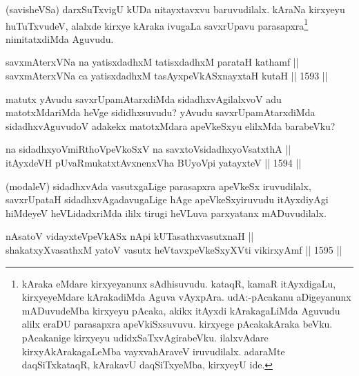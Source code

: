 \begin{artha}
(savisheVSa) darxSuTxvigU kUDa nitayxtavxvu baruvudilalx. kAraNa kirxyeyu huTuTxvudeV, alalxde kirxye kAraka ivugaLa savxrUpavu parasapxra\footnote{kAraka eMdare kirxyeyanunx sAdhisuvudu. kataqR, kamaR itAyxdigaLu, kirxyeyeMdare kArakadiMda Aguva vAyxpAra. udA:-pAcakanu aDigeyanunx mADuvudeMba kirxyeyu pAcaka, akikx itAyxdi kArakagaLiMda Aguvudu alilx eraDU parasapxra apeVkiSxsuvuvu. kirxyege pAcakakAraka beVku. pAcakanige kirxyeyu udidxSaTxvAgirabeVku. ilalxvAdare kirxyAkArakagaLeMba vayxvahAraveV iruvudilalx. adaraMte daqSiTxkataqR, kArakavU daqSiTxyeMba, kirxyeyU ide.} nimitatxdiMda Aguvudu.
\end{artha}


\begin{shl}
savxmAterxVNa na yatisxdadhxM tatisxdadhxM parataH kathamf || \\
savxmAterxVNa ca yatisxdadhxM tasAyxpeVkASx\s nayxtaH kutaH \hfill || 1593 ||  
\end{shl}

\begin{artha}
matutx yAvudu savxrUpamAtarxdiMda sidadhxvAgilalxvoV adu matotxMdariMda heVge sididhxsuvudu? yAvudu savxrUpamAtarxdiMda sidadhxvAguvudoV adakekx matotxMdara apeVkeSxyu elilxMda barabeVku?
\end{artha}


\begin{shl}
na sidadhxyoVmiRthoV\s peVkoSxV na savxtoV\s sidadhxyoVsatxthA  || \\
itAyxdeVH pUvaRmukatxtAvxnenxVha BUyoV\s pi yatayxteV \hfill || 1594 ||  
\end{shl}

\begin{artha}
(modaleV) sidadhxvAda vasutxgaLige parasapxra apeVkeSx iruvudilalx, savxrUpataH sidadhxvAgadavugaLige hAge apeVkeSxyiruvudu itAyxdiyAgi hiMdeyeV heVLidadxriMda ililx tirugi heVLuva parxyatanx mADuvudilalx.
\end{artha}


\begin{shl}
nAsatoV vidayxteV\s peVkASx nApi kUTasathxvasutxnaH || \\
\footnotemark[2]shakatxyXvasathxM yatoV vasutx heVtavxpeVkeSxyXVti vikirxyAmf \hfill || 1595 ||  
\end{shl}

